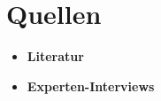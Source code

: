 \section{Quellen}
\nocite{*}

\begin{itemize}
\item \textbf{Literatur} \\
\printbibliography[heading=none]
\item \textbf{Experten-Interviews}\\

\end{itemize}

